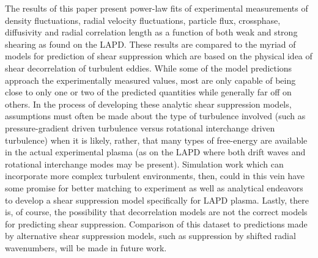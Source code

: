 \documentclass[aip,pop,amsmath,amssymb,preprint,superscriptaddress]{revtex4-1} %
\begin{document}
The results of this paper present power-law fits of experimental measurements of density fluctuations, radial velocity fluctuations, particle flux, crossphase, diffusivity and radial correlation length as a function of both weak and strong shearing as found on the LAPD. These results are compared to the myriad of models for prediction of shear suppression which are based on the physical idea of shear decorrelation of turbulent eddies. While some of the model predictions approach the experimentally measured values, most are only capable of being close to only one or two of the predicted quantities while generally far off on others. In the process of developing these analytic shear suppression models, assumptions must often be made about the type of turbulence involved (such as pressure-gradient driven turbulence versus rotational interchange driven turbulence) when it is likely, rather, that many types of free-energy are available in the actual experimental plasma (as on the LAPD where both drift waves and rotational interchange modes may be present). Simulation work which can incorporate more complex turbulent environments, then, could in this vein have some promise for better matching to experiment as well as analytical endeavors to develop a shear suppression model specifically for LAPD plasma. Lastly, there is, of course, the possibility that decorrelation models are not the correct models for predicting shear suppression. Comparison of this dataset to predictions made by alternative shear suppression models, such as suppression by shifted radial wavenumbers\cite{stabler}, will be made in future work.
\end{document}
